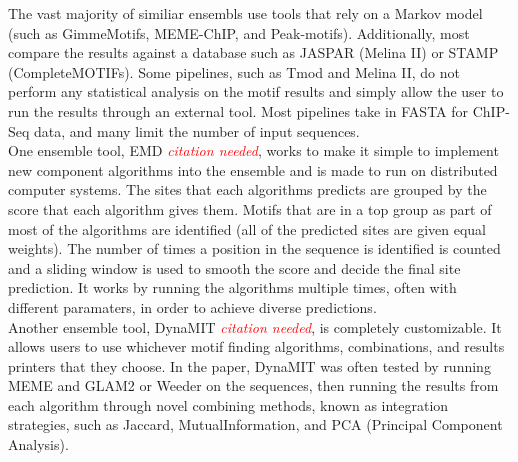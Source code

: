 \documentclass[12pt]{article}
\newenvironment{SLOPPY}{\begin{sloppypar}\hbadness=10000}{\end{sloppypar}}
\newcommand{\comment}[1]{\textcolor{red}{\it{#1}}}
\begin{document}
\begin{SLOPPY}
\indent
The vast majority of similiar ensembls use tools that rely on a  Markov model (such as 
GimmeMotifs, MEME-ChIP, and Peak-motifs). Additionally, most compare the 
results against a database such as JASPAR
(Melina II) or STAMP (CompleteMOTIFs). Some pipelines, such as Tmod and 
Melina II, do not perform any statistical analysis on the motif results and 
simply allow the user to run the results through an external tool. Most 
pipelines take in FASTA for ChIP-Seq data, and many limit the number of input
sequences.\\

One ensemble tool, EMD \comment {citation needed}, works to make it simple to implement new component algorithms 
into the ensemble and is made to run on distributed computer systems.  The sites that each algorithms predicts are grouped 
by the score that each algorithm gives them. Motifs that are in a top group as part of most 
of the algorithms are identified (all of the predicted sites are given equal weights). The number of times a position in 
the sequence is identified is counted and a sliding window is used to smooth the score and decide the final site prediction. 
It works by running the algorithms multiple
times, often with different paramaters, in order to achieve diverse predictions. \\

Another ensemble tool, DynaMIT \comment {citation needed}, is completely customizable. It allows users to use whichever motif finding algorithms, combinations, and results printers that they choose. In the paper, DynaMIT was often tested by running MEME and GLAM2 or Weeder on the sequences, then running the results from each algorithm through novel combining methods, known as integration strategies, such as Jaccard, MutualInformation, and PCA (Principal Component Analysis). 
\end{SLOPPY}
\end{document}
